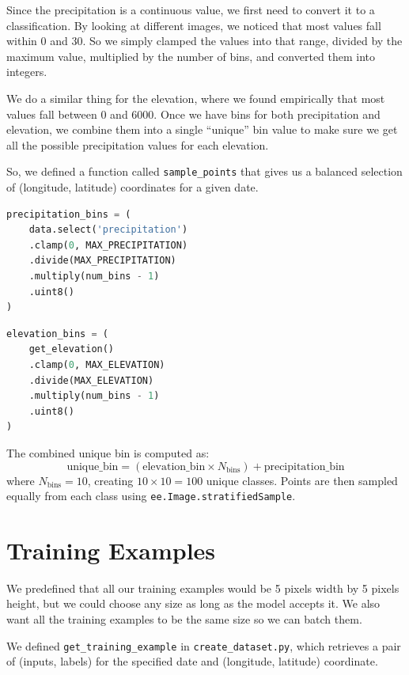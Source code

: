 \documentclass[12pt, a4paper]{report}
\begin{document}
Since the precipitation is a continuous value, we first need to convert it to a classification. By looking at different images, we noticed that most values fall within 0 and 30. So we simply clamped the values into that range, divided by the maximum value, multiplied by the number of bins, and converted them into integers.

We do a similar thing for the elevation, where we found empirically that most values fall between 0 and 6000. Once we have bins for both precipitation and elevation, we combine them into a single ``unique'' bin value to make sure we get all the possible precipitation values for each elevation.

So, we defined a function called \texttt{sample\_points} that gives us a balanced selection of (longitude, latitude) coordinates for a given date.

\begin{lstlisting}[language=Python, caption=Precipitation binning logic.]
precipitation_bins = (
    data.select('precipitation')
    .clamp(0, MAX_PRECIPITATION)
    .divide(MAX_PRECIPITATION)
    .multiply(num_bins - 1)
    .uint8()
)
\end{lstlisting}

\begin{lstlisting}[language=Python, caption=Elevation binning logic.]
elevation_bins = (
    get_elevation()
    .clamp(0, MAX_ELEVATION)
    .divide(MAX_ELEVATION)
    .multiply(num_bins - 1)
    .uint8()
)
\end{lstlisting}

The combined unique bin is computed as:
\begin{equation}
    \text{unique\_bin} = (\text{elevation\_bin} \times N_{\text{bins}}) + \text{precipitation\_bin}
    \label{eq:unique_bin}
\end{equation}
where $N_{\text{bins}} = 10$, creating $10 \times 10 = 100$ unique classes. Points are then sampled equally from each class using \texttt{ee.Image.stratifiedSample}.

\section{Training Examples}

We predefined that all our training examples would be 5 pixels width by 5 pixels height, but we could choose any size as long as the model accepts it. We also want all the training examples to be the same size so we can batch them.

We defined \texttt{get\_training\_example} in \texttt{create\_dataset.py}, which retrieves a pair of (inputs, labels) for the specified date and (longitude, latitude) coordinate.
\end{document}
